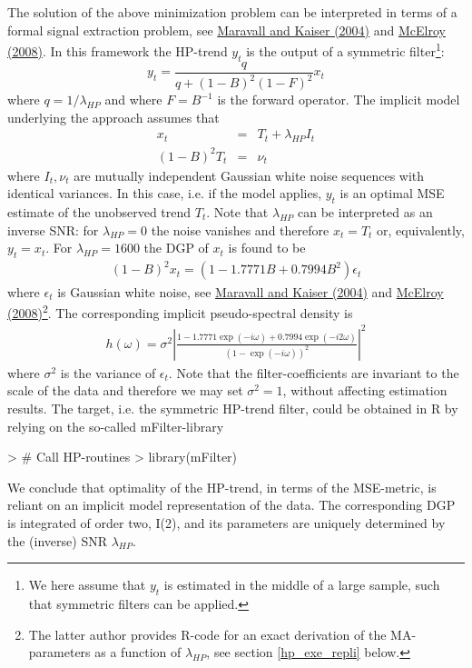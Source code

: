 \documentclass[a4paper]{book}
\begin{document}
The solution of the above minimization problem can be interpreted in terms of a formal signal extraction problem, see 
\href{https://www.dropbox.com/s/dwdx0fcys34g9ku/maravall_kaiser.pdf?dl=0}{Maravall and Kaiser (2004)} and 
\href{https://www.dropbox.com/s/s8zb0buqzygefby/mcelroy_hp.pdf?dl=0}{McElroy (2008)}. In this framework the HP-trend $y_t$ is the output of a symmetric filter\footnote{We here assume that $y_t$ is estimated in the middle of a large sample, such that symmetric filters can be applied.}:
\[y_t=\frac{q}{q+(1-B)^2(1-F)^2}x_t\]
where $q=1/\lambda_{HP}$ and where $F=B^{-1}$ is the forward operator. The implicit model underlying the approach assumes that
\begin{eqnarray*}
x_t&=&T_t+\lambda_{HP} I_t\\
(1-B)^2T_t&=&\nu_t
\end{eqnarray*}
where $I_t,\nu_t$ are mutually independent Gaussian white noise sequences with identical variances. In this case, i.e. if the model applies, $y_t$ is an optimal MSE estimate of the unobserved trend $T_t$. Note that $\lambda_{HP}$ can be interpreted as an inverse SNR: for $\lambda_{HP}=0$ the noise vanishes and therefore $x_t=T_t$ or, equivalently, $y_t=x_t$. For $\lambda_{HP}=1600$ the DGP of $x_t$ is found to be 
\begin{eqnarray}\label{implicit_mode_ass}
(1-B)^2x_t=(1-1.7771B+0.7994B^2)\epsilon_t
\end{eqnarray}
where $\epsilon_t$ is Gaussian white noise, see \href{https://www.dropbox.com/s/dwdx0fcys34g9ku/maravall_kaiser.pdf?dl=0}{Maravall and Kaiser (2004)} and \href{https://www.dropbox.com/s/s8zb0buqzygefby/mcelroy_hp.pdf?dl=0}{McElroy (2008)}\footnote{The latter author provides R-code for an exact derivation of the MA-parameters as a function of $\lambda_{HP}$, see section \ref{hp_exe_repli} below.}. The corresponding implicit pseudo-spectral density is
\begin{eqnarray}\label{hp_pseudo_spec}
h(\omega)=\sigma^2\left|\frac{1-1.7771\exp(-i\omega)+0.7994\exp(-i2\omega)}{(1-\exp(-i\omega))^2}\right|^2
\end{eqnarray}
where $\sigma^2$ is the variance of $\epsilon_t$. Note that the filter-coefficients are invariant to the scale of the data  and therefore we may set $\sigma^2=1$, without affecting estimation results. The target, i.e. the symmetric HP-trend filter, could be obtained in R by relying on the so-called mFilter-library 
\begin{Schunk}
\begin{Sinput}
> # Call HP-routines
> library(mFilter)
\end{Sinput}
\end{Schunk}
We conclude that optimality of the HP-trend, in terms of the MSE-metric, is reliant on an implicit model representation of the data. The corresponding DGP is integrated of order two, I(2), and its parameters are uniquely determined by the (inverse) SNR $\lambda_{HP}$.
\end{document}
